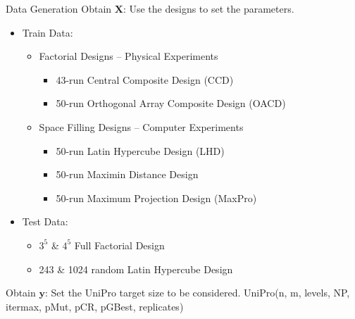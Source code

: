 \documentclass{beamer}
\newcommand{\X}{\boldsymbol{X}}
\newcommand{\y}{\boldsymbol{y}}
\begin{document}
\begin{frame}{Data Generation}
Obtain $\X$: Use the designs to set the parameters.
  \begin{itemize}
  \item Train Data:
  \begin{itemize}
      \item Factorial Designs -- Physical Experiments
        \begin{itemize}
          \item 43-run Central Composite Design (CCD)
          \item 50-run Orthogonal Array Composite Design (OACD)
        \end{itemize}
      \item Space Filling Designs -- Computer Experiments
      \begin{itemize}
        \item 50-run Latin Hypercube Design (LHD)
        \item 50-run Maximin Distance Design
        \item 50-run Maximum Projection Design (MaxPro)
      \end{itemize}
  \end{itemize}
  \item Test Data:
      \begin{itemize}
        \item $3^5$ \& $4^5$ Full Factorial Design
        \item 243 \& 1024 random Latin Hypercube Design
      \end{itemize}
\end{itemize}

Obtain $\y$: Set the UniPro target size to be considered.
\small{\colorbox{gray!50}{\textcolor{blue!50}{UniPro}(n, m, levels, NP, itermax, pMut, pCR, pGBest, replicates)}}

\end{frame}
\end{document}
